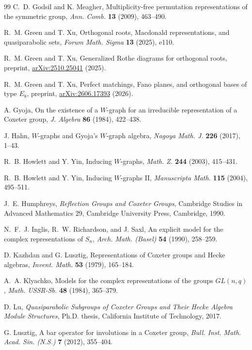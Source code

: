 \documentclass[11pt]{article}
\numberwithin{equation}{section}
\theoremstyle{definition}
\begin{document}
\begin{thebibliography}{99}
C.~D. Godsil and K. Meagher,
Multiplicity-free permutation representations of the symmetric group,
\emph{Ann. Comb.} \textbf{13} (2009), 463--490.

R.~M. Green and T. Xu,
Orthogonal roots, Macdonald representations, and quasiparabolic sets,
\emph{Forum Math. Sigma} \textbf{13} (2025), e110.

R.~M. Green and T. Xu,
Generalized Rothe diagrams for orthogonal roots,
preprint, \href{https://arxiv.org/abs/2510.25041v3}{arXiv:2510.25041} (2025).

R.~M. Green and T. Xu,
Perfect matchings, Fano planes, and orthogonal bases of type \(E_8\),
preprint, \href{https://arxiv.org/abs/2606.17393}{arXiv:2606.17393} (2026).

A. Gyoja,
On the existence of a \(W\)-graph for an irreducible representation of a Coxeter group,
\emph{J. Algebra} \textbf{86} (1984), 422--438.

J. Hahn,
\(W\)-graphs and Gyoja's \(W\)-graph algebra,
\emph{Nagoya Math. J.} \textbf{226} (2017), 1--43.

R.~B. Howlett and Y. Yin,
Inducing \(W\)-graphs,
\emph{Math. Z.} \textbf{244} (2003), 415--431.

R.~B. Howlett and Y. Yin,
Inducing \(W\)-graphs II,
\emph{Manuscripta Math.} \textbf{115} (2004), 495--511.

J.~E. Humphreys,
\emph{Reflection Groups and Coxeter Groups},
Cambridge Studies in Advanced Mathematics 29,
Cambridge University Press, Cambridge, 1990.

N.~F.~J. Inglis, R.~W. Richardson, and J. Saxl,
An explicit model for the complex representations of \(S_n\),
\emph{Arch. Math. (Basel)} \textbf{54} (1990), 258--259.

D. Kazhdan and G. Lusztig,
Representations of Coxeter groups and Hecke algebras,
\emph{Invent. Math.} \textbf{53} (1979), 165--184.

A.~A. Klyachko,
Models for the complex representations of the groups \(GL(n,q)\),
\emph{Math. USSR-Sb.} \textbf{48} (1984), 365--379.

D. Lu,
\emph{Quasiparabolic Subgroups of Coxeter Groups and Their Hecke Algebra Module Structures},
Ph.D. thesis, California Institute of Technology, 2017.

G. Lusztig,
A bar operator for involutions in a Coxeter group,
\emph{Bull. Inst. Math. Acad. Sin. (N.S.)} \textbf{7} (2012), 355--404.


\end{thebibliography}
\end{document}
